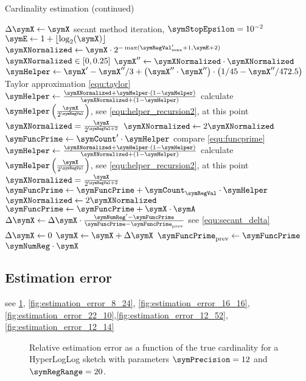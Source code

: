 \documentclass[a4paper]{scrartcl}
\begin{document}
\begin{algorithm}
\caption{Cardinality estimation (continued)}
\begin{algorithmic}
\State $\Delta\symX \gets \symX$
\While{$\Delta\symX > \symX\cdot\symError$} \Comment secant method iteration, $\symStopEpsilon = 10^{-2}$
\State $\symE \gets 1+\lfloor\log_2(\symX)\rfloor$
\State $\symXNormalized \gets
\symX \cdot 2^{-\max(\symRegVal'_\text{max}+1, \symE+2)}$
\Comment $\symXNormalized \in [0, 0.25]$
\State $\symX''\gets \symXNormalized\cdot\symXNormalized$
\State $\symHelper \gets
\symX' - \symX''/3 + \left(\symX''\cdot \symX''\right)\cdot\left(1/45-\symX''/472.5\right)$
\Comment Taylor approximation \eqref{equ:taylor}
\State $\symHelper \gets \frac{\symXNormalized+\symHelper\cdot(1-\symHelper)}{\symXNormalized+(1-\symHelper)}$
\Comment calculate $\symHelper\left(\frac{\symX}{2^{\symRegVal}}\right)$, see \eqref{equ:helper_recursion2}, at this point $\symXNormalized = \frac{\symX}{2^{\symRegVal+2}}$
\State $\symXNormalized \gets 2\symXNormalized$
\EndFor
\State $\symFuncPrime \gets \symCount'\cdot\symHelper$
\Comment compare \eqref{equ:funcprime}
\State $\symHelper \gets \frac{\symXNormalized+\symHelper\cdot(1-\symHelper)}{\symXNormalized+(1-\symHelper)}$
\Comment calculate $\symHelper\left(\frac{\symX}{2^{\symRegVal}}\right)$, see \eqref{equ:helper_recursion2}, at this point $\symXNormalized = \frac{\symX}{2^{\symRegVal+2}}$
\State $\symFuncPrime\gets \symFuncPrime + \symCount_\symRegVal\cdot\symHelper$
\State $\symXNormalized \gets 2\symXNormalized$
\EndFor
\State $\symFuncPrime\gets \symFuncPrime + \symX\cdot\symA$
\State $\Delta\symX \gets \Delta\symX \cdot \frac{\symNumReg' - \symFuncPrime}{\symFuncPrime - \symFuncPrime_\text{prev}}$
\Comment see \eqref{equ:secant_delta}
\Else
\State $\Delta\symX \gets 0$
\EndIf
\State $\symX \gets \symX + \Delta\symX$
\State $\symFuncPrime_\text{prev}\gets \symFuncPrime$
\EndWhile
\State \Return $\symNumReg\cdot\symX$
\EndFunction
\end{algorithmic}
\end{algorithm}

\subsection{Estimation error}

see \cref{fig:estimation_error_12_20}, \cref{fig:estimation_error_8_24}, \cref{fig:estimation_error_16_16},\cref{fig:estimation_error_22_10},\cref{fig:estimation_error_12_52},\cref{fig:estimation_error_12_14}
\begin{figure}
\centering

\caption{Relative estimation error as a function of the true cardinality for a HyperLogLog sketch with parameters $\symPrecision = 12$ and $\symRegRange=20$.}
\label{fig:estimation_error_12_20}
\end{figure}
\end{document}
